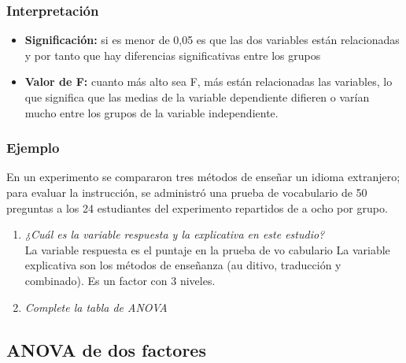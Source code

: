 \documentclass[10pt,letterpaper]{article}
\begin{document}
\subsubsection{Interpretación}
\begin{itemize}
\item    \textbf{Significación:} si es menor de 0,05 es que las dos variables están relacionadas y por tanto que hay diferencias significativas entre los grupos
\item    \textbf{Valor de F:} cuanto más alto sea F, más están relacionadas las variables, lo que significa que las medias de la variable dependiente difieren o varían mucho entre los grupos de la variable independiente.
\end{itemize}
\subsubsection{Ejemplo}
En  un  experimento  se  compararon  tres  métodos  de  enseñar  un  idioma  extranjero;  para  evaluar  la 
instrucción, se administró una prueba de vocabulario de 50 preguntas a los 24 estudiantes del experimento  repartidos de a ocho por grupo. 

\begin{enumerate}[label=\Alph*)]
\item \textit{¿Cuál es la variable respuesta y la explicativa en este estudio?}\\ ${ }$\\
La variable respuesta es el puntaje en la prueba de vo
cabulario 
La variable explicativa son los métodos de enseñanza (au
ditivo, traducción y combinado). Es un 
factor con 3 niveles. 
\item \textit{Complete la tabla de ANOVA}
\end{enumerate}
\subsection{ANOVA de dos factores}
\end{document}
